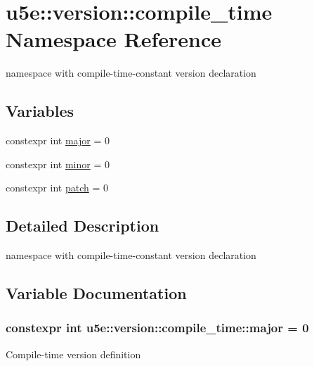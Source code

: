 \hypertarget{namespaceu5e_1_1version_1_1compile__time}{}\section{u5e\+:\+:version\+:\+:compile\+\_\+time Namespace Reference}
\label{namespaceu5e_1_1version_1_1compile__time}


namespace with compile-\/time-\/constant version declaration  


\subsection*{Variables}
{\bf }\par
\begin{DoxyCompactItemize}
\item 
constexpr int \hyperlink{namespaceu5e_1_1version_1_1compile__time_a2be664471001b8cf28cd45f43959481d}{major} = 0
\item 
constexpr int \hyperlink{namespaceu5e_1_1version_1_1compile__time_aa78edd034bf2288b19857e7c5fa4902c}{minor} = 0
\item 
constexpr int \hyperlink{namespaceu5e_1_1version_1_1compile__time_ab8ec01673d09045da55c873aa59c1a22}{patch} = 0
\end{DoxyCompactItemize}



\subsection{Detailed Description}
namespace with compile-\/time-\/constant version declaration 

\subsection{Variable Documentation}
\subsubsection[{\texorpdfstring{major}{major}}]{\setlength{\rightskip}{0pt plus 5cm}constexpr int u5e\+::version\+::compile\+\_\+time\+::major = 0}\hypertarget{namespaceu5e_1_1version_1_1compile__time_a2be664471001b8cf28cd45f43959481d}{}\label{namespaceu5e_1_1version_1_1compile__time_a2be664471001b8cf28cd45f43959481d}
Compile-\/time version definition 

